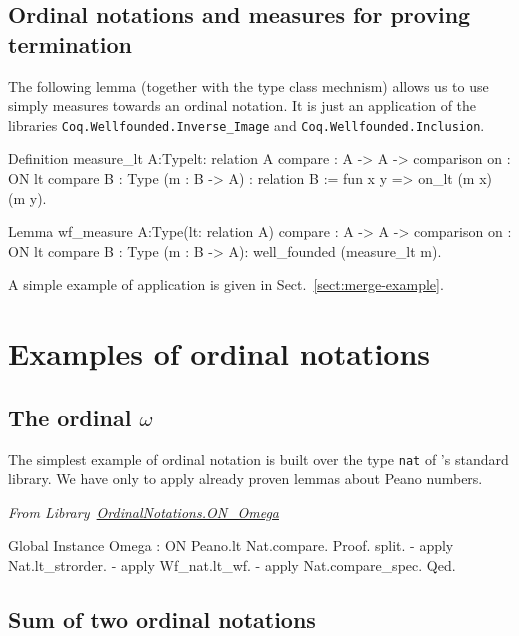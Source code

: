 \documentclass[a4paper]{book}
\begin{document}
\subsection{Ordinal notations and measures for proving termination}
\label{sect:measure-ON}

The following lemma (together with the type class mechnism) allows us to use simply  measures towards an ordinal notation. It is just an application of  the libraries \texttt{Coq.Wellfounded.Inverse\_Image}
and  \texttt{Coq.Wellfounded.Inclusion}. 

\begin{Coqsrc}
Definition measure_lt {A:Type}{lt: relation A}
            {compare : A -> A -> comparison}
            {on : ON lt compare}
            {B : Type} (m : B -> A) : relation B :=
             fun x y => on_lt (m x) (m y).
            
Lemma wf_measure  {A:Type}(lt: relation A)
            {compare : A -> A -> comparison}
            {on : ON lt compare}
            {B : Type}
            (m : B -> A):  well_founded (measure_lt m). 
\end{Coqsrc}

A simple example of application is given in Sect.~\vref{sect:merge-example}.


\section{Examples of ordinal notations}


\subsection{The ordinal \texorpdfstring{$\omega$}{omega}}

The simplest example of ordinal notation is built over the type \texttt{nat} of \coq's standard library. We have only to apply already proven lemmas about Peano numbers.

\vspace{4pt}
\noindent\emph{From Library~\href{../src/html/hydras.OrdinalNotations/ON_Omega.html}{OrdinalNotations.ON\_Omega}}


\begin{Coqsrc}
Global Instance Omega : ON  Peano.lt Nat.compare.
Proof.
 split.
 - apply Nat.lt_strorder.
 - apply Wf_nat.lt_wf.
 - apply Nat.compare_spec.
Qed.
\end{Coqsrc}


\subsection{Sum of two ordinal notations}
\end{document}
